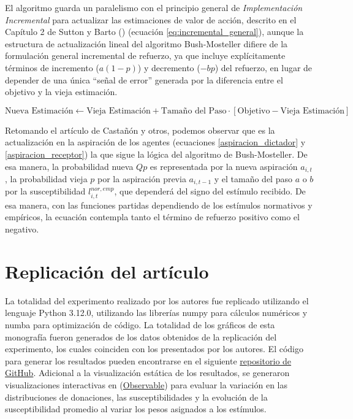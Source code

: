 \documentclass[12pt,a4paper]{article}
\begin{document}
El algoritmo guarda un paralelismo con el principio general de \textit{Implementación 
Incremental} para actualizar las estimaciones de valor de acción, descrito en el Capítulo 2 de 
Sutton y Barto (\citeyear{sutton1998reinforcement}) (ecuación \ref{eq:incremental_general}), 
aunque la estructura de actualización lineal del algoritmo Bush-Mosteller difiere de la 
formulación general incremental de refuerzo, ya que incluye explícitamente términos de 
incremento ($a(1-p)$) y decremento ($-bp$) del refuerzo, en lugar de depender de una única 
“señal de error” generada por la diferencia entre el objetivo y la vieja estimación.

\begin{equation}
\text{Nueva Estimación} \leftarrow \text{Vieja Estimación} + \text{Tamaño del Paso} \cdot [\text{Objetivo} - \text{Vieja Estimación}]
\label{eq:incremental_general}
\end{equation}

Retomando el artículo de Castañón y otros, podemos observar que es la actualización en la 
aspiración de los agentes (ecuaciones \ref{aspiracion_dictador} y \ref{aspiracion_receptor}) la que sigue la lógica del algoritmo de Bush-Mosteller. De esa manera, la probabilidad nueva $Qp$ es representada por la nueva aspiración $a_{i,t}$, la probabilidad vieja $p$ por la aspiración previa $a_{i,t-1}$ y el tamaño del paso $a$ o $b$ por la susceptibilidad $l_{i,t}^{nor,emp}$, que dependerá del signo del estímulo recibido. De esa manera, con las funciones partidas dependiendo de los estímulos normativos y empíricos, la ecuación contempla tanto el término de refuerzo positivo como el negativo.

\section{Replicación del artículo}

La totalidad del experimento realizado por los autores fue replicado utilizando el lenguaje Python 3.12.0,
utilizando las librerías numpy para cálculos numéricos y numba para optimización de código. La totalidad de los
gráficos de esta monografía fueron generados de los datos obtenidos de la replicación del experimento, los cuales
coinciden con los presentados por los autores. El código para generar los resultados pueden encontrarse en el siguiente 
\href{https://github.com/josesg998/CursoRL/blob/master/monografia/replication_optimized.py}{repositorio de GitHub}. 
Adicional a la visualización estática de los resultados, se generaron visualizaciones interactivas en 
(\href{https://observablehq.com/d/cf06ca99cc73fbd7}{Observable}) para evaluar la variación en las distribuciones de 
donaciones, las susceptibilidades y la evolución de la susceptibilidad promedio al variar los pesos asignados a los 
estímulos.
\end{document}
